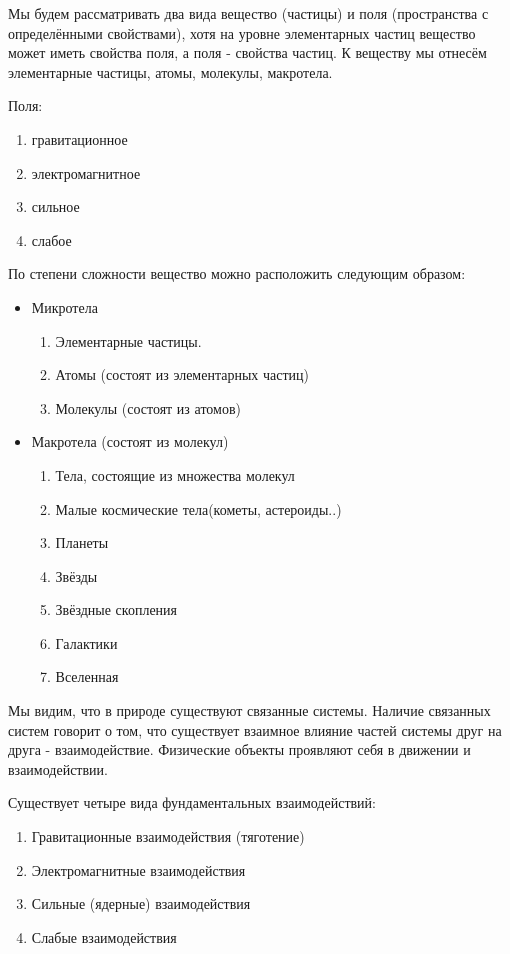 \documentclass[a6paper, 11pt]{diss_4}
\renewcommand{\'}{\,'}
\begin{document}
 Мы будем рассматривать два вида вещество (частицы) и поля (пространства с
определёнными свойствами), хотя на уровне элементарных частиц вещество может
иметь свойства поля, а поля - свойства частиц. К веществу мы отнесём
элементарные частицы, атомы, молекулы, макротела.

Поля:
\begin{enumerate}
  \item гравитационное
  \item электромагнитное
  \item сильное
  \item слабое
\end{enumerate}

По степени сложности вещество можно расположить следующим образом:

\begin{itemize}
  \item {Микротела
  \begin{enumerate}
  \item Элементарные частицы.
  \item Атомы (состоят из элементарных частиц)
  \item Молекулы (состоят из атомов)
  \end{enumerate}
  }
  \item{ Макротела (состоят из молекул)
  \begin{enumerate}
  \item Тела, состоящие из множества молекул
  \item Малые космические тела(кометы, астероиды..)
  \item Планеты
  \item Звёзды
  \item Звёздные скопления
  \item Галактики
  \item Вселенная
  \end{enumerate}
  }
\end{itemize}

 Мы видим, что в природе существуют связанные системы. Наличие связанных
систем говорит о том, что существует взаимное влияние частей системы друг на
друга - взаимодействие. Физические объекты проявляют себя в движении и
взаимодействии.

 Существует четыре вида фундаментальных взаимодействий:

\begin{enumerate}
  \item Гравитационные взаимодействия (тяготение)
  \item Электромагнитные взаимодействия
  \item Сильные (ядерные) взаимодействия
  \item Слабые взаимодействия
\end{enumerate}
\end{document}
